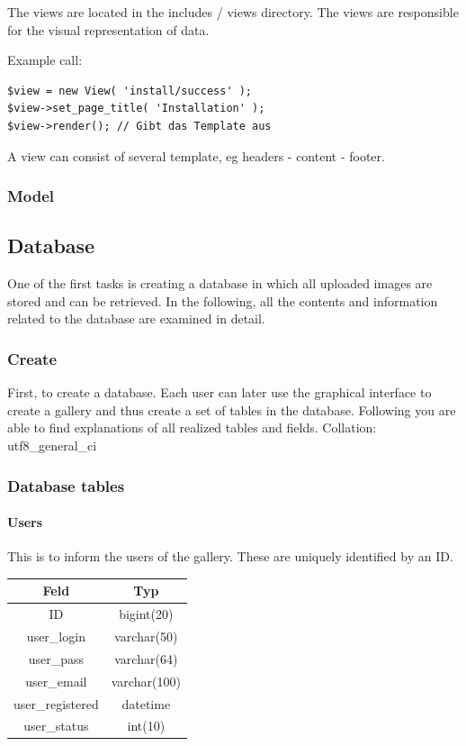 \documentclass[a4paper,12pt,oneside]{article} %
\begin{document}
The views are located in the 
includes / views
 directory. The views are responsible for the visual representation
of data.

Example call:

\begin{lstlisting}
$view = new View( 'install/success' ); 
$view->set_page_title( 'Installation' );  
$view->render(); // Gibt das Template aus
\end{lstlisting}

A view can consist of several template, eg headers - content - footer.


\subsubsection*{Model}


\subsection{Database }

One of the first tasks is creating a database in which all uploaded
images are stored and can be retrieved. In the following, all the
contents and information related to the database are examined in detail.


\subsubsection{Create}

First, to create a database.  Each user can later use the graphical
interface to create a gallery and thus create a set of tables in the
database. Following you are able to find explanations of all realized
tables and fields. Collation: utf8\_general\_ci


\subsubsection{Database tables}


\paragraph*{Users}

This is to inform the users of the gallery. These are uniquely identified
by an ID.
\begin{tabular}{|c|c|}
\hline 
Feld & Typ\tabularnewline
\hline 
\hline 
ID & bigint(20)\tabularnewline
\hline 
user\_login & varchar(50)\tabularnewline
\hline 
user\_pass & varchar(64)\tabularnewline
\hline 
user\_email & varchar(100)\tabularnewline
\hline 
user\_registered & datetime\tabularnewline
\hline 
user\_status & int(10)\tabularnewline
\hline 
\end{tabular}
\end{document}
